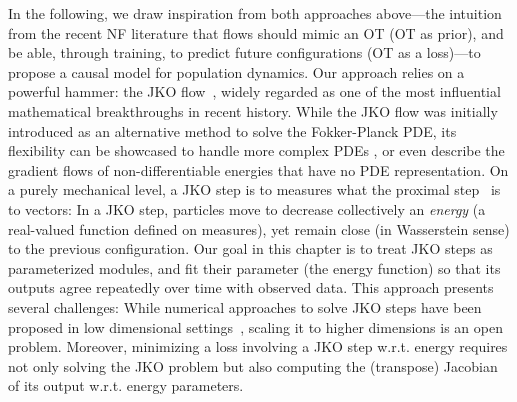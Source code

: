 In the following, we draw inspiration from both approaches above---the intuition from the recent \acrlong{NF} literature that flows should mimic an \acrlong{OT} (\acrshort{OT} as prior), and be able, through training, to predict future configurations (\acrshort{OT} as a loss)---to propose a causal model for population dynamics. Our approach relies on a powerful hammer: the \acrlong{JKO} flow~\citep{jordan1998variational}, widely regarded as one of the most influential mathematical breakthroughs in recent history. While the \acrshort{JKO} flow was initially introduced as an alternative method to solve the Fokker-Planck \acrshort{PDE}, its flexibility can be showcased to handle more complex PDEs \citep[\S4.7]{santambrogio2017euclidean}, or even describe the gradient flows of non-differentiable energies that have no PDE representation.
On a purely mechanical level, a \acrshort{JKO} step is to measures what the proximal step~\citep{combettes2011proximal} is to vectors: In a \acrshort{JKO} step, particles move to decrease collectively an {\em energy} (a real-valued function defined on measures), yet remain close (in Wasserstein sense) to the previous configuration. Our goal in this chapter is to treat \acrshort{JKO} steps as parameterized modules, and fit their parameter (the energy function) so that its outputs agree repeatedly over time with observed data. 
This approach presents several challenges: While numerical approaches to solve \acrshort{JKO} steps have been proposed in low dimensional settings~\citep{burger2010a, carrillo2021primal, peyre2015entropic,benamou2016augmented}, scaling it to higher dimensions is an open problem. Moreover, minimizing a loss involving a \acrshort{JKO} step w.r.t. energy requires not only solving the \acrshort{JKO} problem but also computing the (transpose) Jacobian of its output w.r.t. energy parameters. \\



